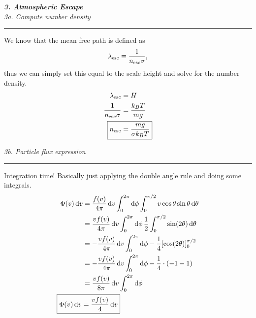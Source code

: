 \documentclass[12pt, letterpaper, twoside]{article}
\newcommand{\question}[1]{{\noindent \it #1}}
\newcommand{\answer}[1]{
    \par\noindent\rule{\textwidth}{0.4pt}#1\vspace{0.5cm}
}
\begin{document}
\pagebreak

\question{\textbf{3. Atmospheric Escape}}\\

\question{3a. Compute number density}
\answer{
    We know that the mean free path is defined as
    \begin{equation}
        \lambda_{\rm esc} \equiv \frac{1}{n_{\rm esc} \sigma},
    \end{equation}
    thus we can simply set this equal to the scale height and solve for the number density.
    \begin{align}
        \lambda_{\rm esc} &= H \\
        \frac{1}{n_{\rm esc} \sigma} &= \frac{k_B T}{m g} \\
        \Aboxed{ n_{\rm esc} &= \frac{m g}{\sigma k_B T} }
    \end{align}
}

\question{3b. Particle flux expression}
\answer{
    Integration time! Basically just applying the double angle rule and doing some integrals.
    \begin{align}
        \Phi(v) \dd{v} &= \frac{f(v)}{4 \pi} \dd{v} \int_0^{2\pi} \dd{\phi} \int_0^{\pi/2} v \cos \theta \sin \theta \dd{\theta} \\
                       &= \frac{v f(v)}{4 \pi} \dd{v} \int_0^{2\pi} \dd{\phi} \frac{1}{2} \int_0^{\pi/2} \sin (2 \theta) \dd{\theta} \\
                       &= -\frac{v f(v)}{4 \pi} \dd{v} \int_0^{2\pi} \dd{\phi} -\frac{1}{4} \qty[\cos (2 \theta)]_0^{\pi/2} \\
                       &= -\frac{v f(v)}{4 \pi} \dd{v} \int_0^{2\pi} \dd{\phi} -\frac{1}{4} \cdot \qty(-1 - 1) \\
                       &= \frac{v f(v)}{8 \pi} \dd{v} \int_0^{2\pi} \dd{\phi} \\
        \Aboxed{ \Phi(v) \dd{v}  &= \frac{v f(v)}{4} \dd{v} }
    \end{align}
}
\end{document}
